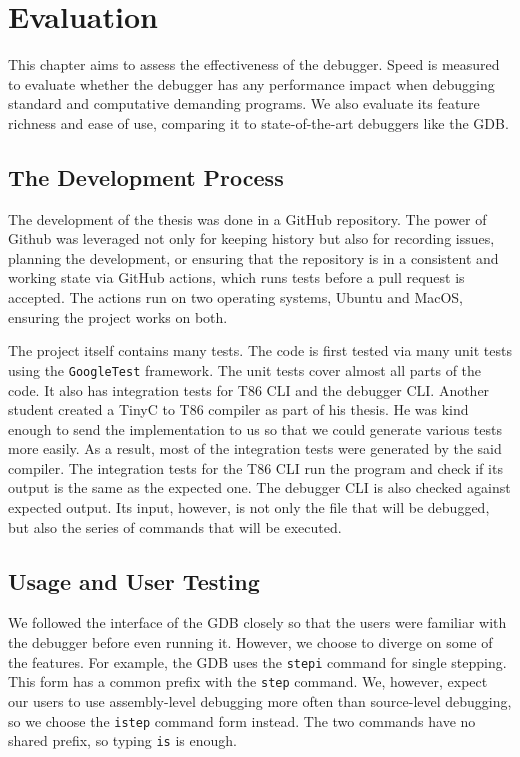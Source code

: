 \chapter{Evaluation}
This chapter aims to assess the effectiveness of the debugger. Speed is
measured to evaluate whether the debugger has any performance impact when
debugging standard and computative demanding programs. We also evaluate its
feature richness and ease of use, comparing it to state-of-the-art debuggers
like the GDB.

\section{The Development Process}
The development of the thesis was done in a GitHub repository. The power of
Github was leveraged not only for keeping history but also for recording
issues, planning the development, or ensuring that the repository is in a
consistent and working state via GitHub actions, which runs tests before a pull
request is accepted. The actions run on two operating systems, Ubuntu and
MacOS, ensuring the project works on both.

The project itself contains many tests. The code is first tested via many unit
tests using the \texttt{GoogleTest} framework. The unit tests
cover almost all parts of the code. It also has integration tests for T86 CLI
and the debugger CLI. Another student created a TinyC to T86
compiler as part of his thesis. He was kind enough to send the implementation
to us so that we could generate various tests more easily. As a result, most of
the integration tests were generated by the said compiler. The integration
tests for the T86 CLI run the program and check if its output is the same as
the expected one. The debugger CLI is also checked against expected output.
Its input, however, is not only the file that will be debugged, but also the
series of commands that will be executed.

\section{Usage and User Testing}
We followed the interface of the GDB closely so that the users were familiar
with the debugger before even running it. However, we choose to diverge on some
of the features. For example, the GDB uses the \texttt{stepi} command for
single stepping. This form has a common prefix with the \texttt{step} command.
We, however, expect our users to use assembly-level debugging more often than
source-level debugging, so we choose the \texttt{istep} command form instead.
The two commands have no shared prefix, so typing \texttt{is} is enough.

